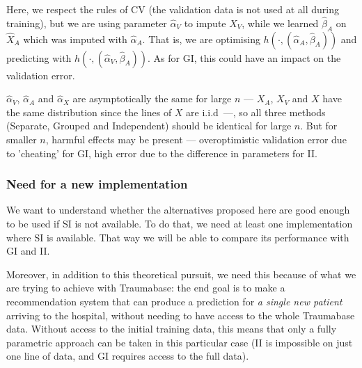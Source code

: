 Here, we respect the rules of CV (the validation data is not used at all during training), but we are using parameter $\hat{\alpha}_V$ to impute $X_V$, while we learned $\hat{\beta}_A$ on $\hat{X}_A$ which was imputed with $\hat{\alpha}_A$. That is, we are optimising $h(\cdot,(\hat{\alpha}_A, \hat{\beta}_A))$ and predicting with $h(\cdot,(\hat{\alpha}_V, \hat{\beta}_A))$. As for GI, this could have an impact on the validation error.

$\hat{\alpha}_V$, $\hat{\alpha}_A$ and $\hat{\alpha}_X$ are asymptotically the same for large $n$ --- $X_A$, $X_V$ and $X$ have the same distribution since the lines of $X$ are i.i.d\ ---, so all three methods (Separate, Grouped and Independent) should be identical for large $n$. But for smaller $n$, harmful effects may be present --- overoptimistic validation error due to 'cheating' for GI, high error due to the difference in parameters for II.


			\subsubsection{Need for a new implementation}
We want to understand whether the alternatives proposed here are good enough to be used if SI is not available. To do that, we need at least one implementation where SI is available. That way we will be able to compare its performance with GI and II.

Moreover, in addition to this theoretical pursuit, we need this because of what we are trying to achieve with Traumabase: the end goal is to make a recommendation system that can produce a prediction for \emph{a single new patient} arriving to the hospital, without needing to have access to the whole Traumabase data. Without access to the initial training data, this means that only a fully parametric approach can be taken in this particular case (II is impossible on just one line of data, and GI requires access to the full data).

